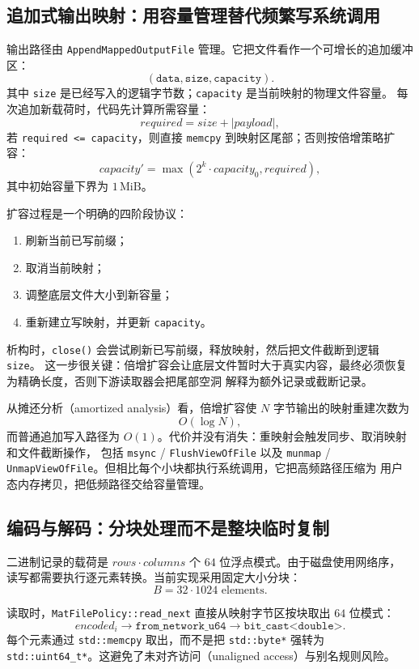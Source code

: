 \subsection{追加式输出映射：用容量管理替代频繁写系统调用}

输出路径由 \texttt{AppendMappedOutputFile} 管理。它把文件看作一个可增长的追加缓冲区：
\[
    (\texttt{data},\texttt{size},\texttt{capacity}).
\]
其中 \texttt{size} 是已经写入的逻辑字节数；\texttt{capacity} 是当前映射的物理文件容量。
每次追加新载荷时，代码先计算所需容量：
\[
    required=size+|payload|,
\]
若 \texttt{required <= capacity}，则直接 \texttt{memcpy} 到映射区尾部；否则按倍增策略扩容：
\[
    capacity'=\max(2^k\cdot capacity_0,required),
\]
其中初始容量下界为 $1\,\mathrm{MiB}$。

扩容过程是一个明确的四阶段协议：

\begin{enumerate}
    \item 刷新当前已写前缀；
    \item 取消当前映射；
    \item 调整底层文件大小到新容量；
    \item 重新建立写映射，并更新 \texttt{capacity}。
\end{enumerate}

析构时，\texttt{close()} 会尝试刷新已写前缀，释放映射，然后把文件截断到逻辑 \texttt{size}。
这一步很关键：倍增扩容会让底层文件暂时大于真实内容，最终必须恢复为精确长度，否则下游读取器会把尾部空洞
解释为额外记录或截断记录。

从摊还分析（amortized analysis）看，倍增扩容使 $N$ 字节输出的映射重建次数为
\[
    O(\log N),
\]
而普通追加写入路径为 $O(1)$。代价并没有消失：重映射会触发同步、取消映射和文件截断操作，
包括 \texttt{msync} / \texttt{FlushViewOfFile} 以及
\texttt{munmap} / \texttt{UnmapViewOfFile}。但相比每个小块都执行系统调用，它把高频路径压缩为
用户态内存拷贝，把低频路径交给容量管理。

\subsection{编码与解码：分块处理而不是整块临时复制}

二进制记录的载荷是 $rows\cdot columns$ 个 $64$ 位浮点模式。由于磁盘使用网络序，
读写都需要执行逐元素转换。当前实现采用固定大小分块：
\[
    B=32\cdot1024 \text{ elements}.
\]

读取时，\texttt{MatFilePolicy::read\_next} 直接从映射字节区按块取出 $64$ 位模式：
\[
    encoded_i \rightarrow \texttt{from\_network\_u64} \rightarrow \texttt{bit\_cast<double>}.
\]
每个元素通过 \texttt{std::memcpy} 取出，而不是把 \texttt{std::byte*} 强转为
\texttt{std::uint64\_t*}。这避免了未对齐访问（unaligned access）与别名规则风险。

